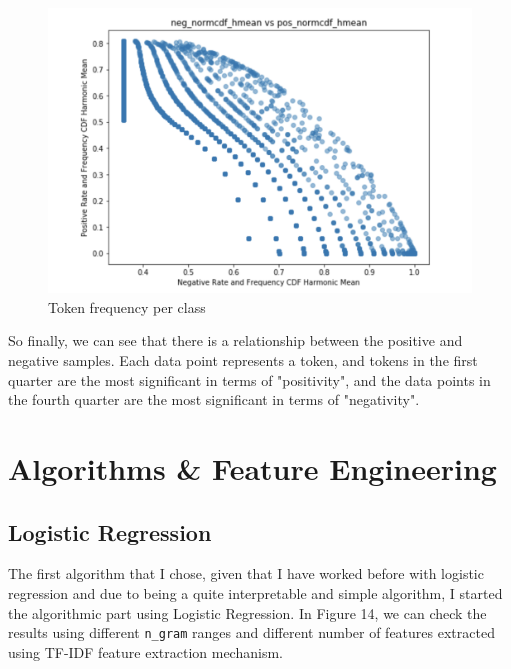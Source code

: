 \documentclass{article}
\begin{document}
	\begin{figure}[h]
		\label{Figure 12}
		\caption{Token frequency per class}
		\includegraphics[scale=0.55]{norcdf.png}
		\centering
	\end{figure}


So finally, we can see that there is a relationship between the positive and negative samples. Each data point represents a token, and tokens in the first quarter are the most significant in terms of "positivity", and the data points in the fourth quarter are the most significant in terms of "negativity".


	
	\section{Algorithms \& Feature Engineering}
	\subsection{Logistic Regression}
	
	The first algorithm that I chose, given that I have worked before with logistic regression and due to being a quite interpretable and simple algorithm, I started the algorithmic part using Logistic Regression. In Figure 14, we can check the results using different \texttt{n\_gram} ranges and different number of features extracted using TF-IDF feature extraction mechanism. 
	
\end{document}
